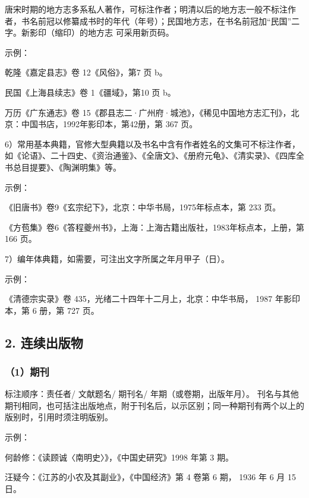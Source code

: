 \documentclass{article}
\begin{document}
唐宋时期的地方志多系私人著作，可标注作者；明清以后的地方志一般不标注作者，书名前冠以修纂成书时的年代（年号）；民国地方志，在书名前冠加“民国”二字。新影印（缩印）的地方志 可采用新页码。

示例：

乾隆《嘉定县志》卷 12《风俗》，第7 页 b。

民国《上海县续志》卷 1《疆域》，第10 页 b。

万历《广东通志》卷 15《郡县志二·广州府·城池》，《稀见中国地方志汇刊》，北京：中国书店，1992年影印本，第42册，第 367 页。


6）常用基本典籍，官修大型典籍以及书名中含有作者姓名的文集可不标注作者，如《论语》、二十四史、《资治通鉴》、《全唐文》、《册府元龟》、《清实录》、《四库全书总目提要》、《陶渊明集》等。

示例：

《旧唐书》卷9《玄宗纪下》，北京：中华书局，1975年标点本，第 233 页。

《方苞集》卷6《答程夔州书》，上海：上海古籍出版社，1983年标点本，上册，第166 页。

7）编年体典籍，如需要，可注出文字所属之年月甲子（日）。

示例：

《清德宗实录》卷 435，光绪二十四年十二月上，北京：中华书局， 1987 年影印本，第 6 册，第 727 页。


\subsection*{2. 连续出版物}

\subsubsection*{（1）期刊}

标注顺序：责任者/ 文献题名/ 期刊名/ 年期（或卷期，出版年月）。
        刊名与其他期刊相同，也可括注出版地点，附于刊名后，以示区别；同一种期刊有两个以上的版别时，引用时须注明版别。

示例：

何龄修：《读顾诚〈南明史〉》，《中国史研究》1998 年第 3 期。

汪疑今：《江苏的小农及其副业》，《中国经济》第 4 卷第 6 期， 1936 年 6 月 15 日。
\end{document}
